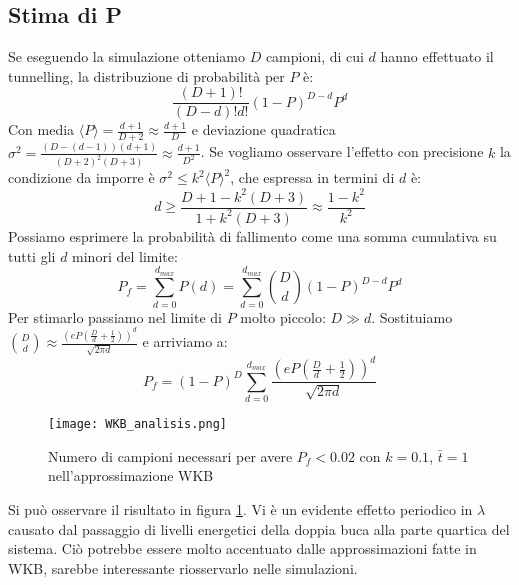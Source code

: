 \documentclass[italian]{article}
\begin{document}
	\subsection{Stima di P}
	Se eseguendo la simulazione otteniamo $D$ campioni, di cui $d$ hanno effettuato il tunnelling, la distribuzione di probabilità per $P$ è:
	\begin{equation}
		\frac{\left(D+1\right)!}{\left(D-d\right)!d!}(1-P)^{D-d}P^{d}
	\end{equation}
	Con media $\langle P\rangle=\frac{d+1}{D+2} \approx \frac{d+1}{D}$ e deviazione quadratica $\sigma^2 =\frac{\left(D-\left(d-1\right)\right)\left(d+1\right)}{\left(D+2\right)^{2}\left(D+3\right)} \approx \frac{d+1}{D^2}$. Se vogliamo osservare l'effetto con precisione $k$ la condizione da imporre è $\sigma^2 \le k^2 \langle P\rangle^2 $, che espressa in termini di $d$ è:
	\begin{equation*}
		d \ge \frac{D+1 - k^2(D+3)}{1 + k^2(D+3)} \approx \frac{1-k^2}{k^2}
	\end{equation*}
	Possiamo esprimere la probabilità di fallimento come una somma cumulativa su tutti gli $d$ minori del limite:
	\begin{equation}
		P_f =  \sum_{d=0}^{d_{max}} P(d) =  \sum_{d=0}^{d_{max}} {D\choose d}(1-P)^{D-d}P^d
	\end{equation}
	Per stimarlo passiamo nel limite di $P$ molto piccolo: $D \gg d$.
	Sostituiamo ${D\choose d} \approx \frac{\left(eP\left(\frac{D}{d}+\frac{1}{2}\right)\right)^{d}}{\sqrt{2\pi d}}$ e arriviamo a:
	\begin{equation}
	P_f = \left({1-P} \right)^D \sum_{d=0}^{d_{max}}
	 \frac{\left(eP\left(\frac{D}{d}+\frac{1}{2}\right)\right)^{d}}{\sqrt{2\pi d}}
	\end{equation}
	\begin{figure}[h]
		\label{D_estimate_pic}
		\texttt{[image: WKB\_analisis.png]}
		\centering
		\caption{Numero di campioni necessari per avere $P_f < 0.02$ con $k = 0.1$, $\bar{t} = 1$ nell'approssimazione WKB}
	\end{figure}
	Si può osservare il risultato in figura \ref{D_estimate_pic}.
	Vi è un evidente effetto periodico in $\lambda$ causato dal passaggio di livelli energetici della doppia buca alla parte quartica del sistema. Ciò potrebbe essere molto accentuato dalle approssimazioni fatte in WKB, sarebbe interessante riosservarlo nelle simulazioni.
\end{document}
